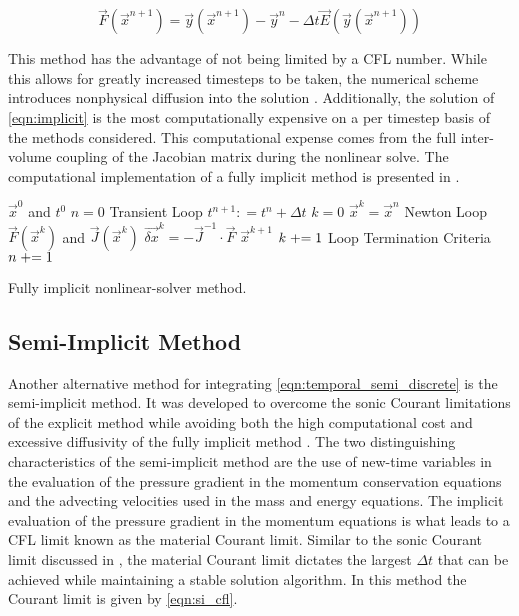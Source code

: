 \begin{equation}
\label{eqn:implicit}
\vec{F}(\vec{x}^{n+1}) = \vec{y}(\vec{x}^{n+1}) - \vec{y}^{n} - \Delta t \vec{E}(\vec{y}(\vec{x}^{n+1}))
\end{equation}

This method has the advantage of not being limited by a CFL number.
While this allows for greatly increased timesteps to be taken, the numerical scheme introduces nonphysical diffusion into the solution \cite{Mahaffy1993}.
Additionally, the solution of \eqref{eqn:implicit} is the most computationally expensive on a per timestep basis of the methods considered.
This computational expense comes from the full inter-volume coupling of the Jacobian matrix during the nonlinear solve.
The computational implementation of a fully implicit method is presented in .

\begin{algo}[ht!]
\setlength{\baselineskip}{0.625\baselineskip}
\begin{algorithmic}[1]
\Require $\vec{x}^{0}$ and $t^{0}$
\Set $n = 0$
\Loop \; Transient Loop
    \Set $t^{n+1} : = t^{n} + \Delta t$
    \Set $k = 0$
    \Set $\vec{x}^{k} = \vec{x}^{n}$
    \Loop \; Newton Loop
		\Calculate $\vec{F}(\vec{x}^{k})$ and $\vec{J}(\vec{x}^{k})$
		\Calculate $\vec{\delta x}^k = - \vec{J}^{-1}\cdot\vec{F}$
		\BlackBox $\vec{x}^{k+1}$
		\Set $k \mathrel{+}= 1$
		\BlackBox Loop Termination Criteria
	\EndLoop	
	\Set $n \mathrel{+}= 1$
\EndLoop
\end{algorithmic}
\caption{Fully implicit nonlinear-solver method.}
\label{algo:implicit}
\end{algo}

\subsection{Semi-Implicit Method}
\label{subsect:semi_implicit}

Another alternative method for integrating \eqref{eqn:temporal_semi_discrete} is the semi-implicit method.
It was developed to overcome the sonic Courant limitations of the explicit method while avoiding both the high computational cost and excessive diffusivity of the fully implicit method \cite{Liles1978}.
The two distinguishing characteristics of the semi-implicit method are the use of new-time variables in the evaluation of the pressure gradient in the momentum conservation equations and the advecting velocities used in the mass and energy equations. 
The implicit evaluation of the pressure gradient in the momentum equations is what leads to a CFL limit known as the material Courant limit.
Similar to the sonic Courant limit discussed in , the material Courant limit dictates the largest $\Delta t$ that can be achieved while maintaining a stable solution algorithm.
In this method the Courant limit is given by \eqref{eqn:si_cfl}.

